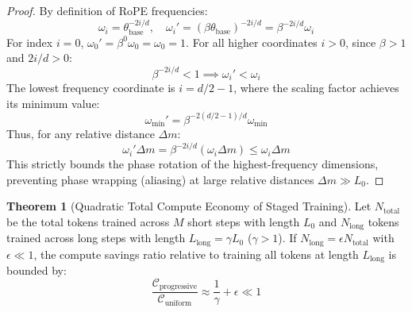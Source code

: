 \documentclass[11pt,a4paper]{article}
\theoremstyle{definition}
\newtheorem{theorem}{\textbf{Theorem}}[section]
\begin{document}
\begin{proof}
By definition of RoPE frequencies:
{\boldmath
\begin{equation}
\omega_i = \theta_{\text{base}}^{-2i/d}, \quad \omega_i' = (\beta \theta_{\text{base}})^{-2i/d} = \beta^{-2i/d} \omega_i
\end{equation}
}
For index $i = 0$, $\omega_0' = \beta^0 \omega_0 = \omega_0 = 1$.
For all higher coordinates $i > 0$, since $\beta > 1$ and $2i/d > 0$:
{\boldmath
\begin{equation}
\beta^{-2i/d} < 1 \implies \omega_i' < \omega_i
\end{equation}
}
The lowest frequency coordinate is $i = d/2 - 1$, where the scaling factor achieves its minimum value:
{\boldmath
\begin{equation}
\omega_{\min}' = \beta^{-2(d/2 - 1)/d} \omega_{\min}
\end{equation}
}
Thus, for any relative distance $\Delta m$:
{\boldmath
\begin{equation}
\omega_i' \Delta m = \beta^{-2i/d} (\omega_i \Delta m) \le \omega_i \Delta m
\end{equation}
}
This strictly bounds the phase rotation of the highest-frequency dimensions, preventing phase wrapping (aliasing) at large relative distances $\Delta m \gg L_0$.
\end{proof}

\begin{theorem}[Quadratic Total Compute Economy of Staged Training]
Let $N_{\text{total}}$ be the total tokens trained across $M$ short steps with length $L_0$ and $N_{\text{long}}$ tokens trained across long steps with length $L_{\text{long}} = \gamma L_0$ ($\gamma > 1$). If $N_{\text{long}} = \epsilon N_{\text{total}}$ with $\epsilon \ll 1$, the compute savings ratio relative to training all tokens at length $L_{\text{long}}$ is bounded by:
{\boldmath
\begin{equation}
\frac{\mathcal{C}_{\text{progressive}}}{\mathcal{C}_{\text{uniform}}} \approx \frac{1}{\gamma} + \epsilon \ll 1
\end{equation}
}
\end{theorem}
\end{document}
